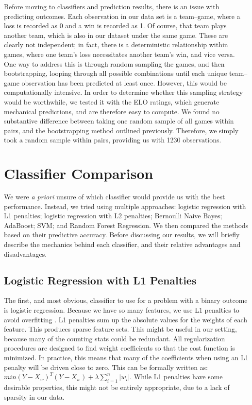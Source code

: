 \documentclass[12pt]{article}
\begin{document}
Before moving to classifiers and prediction results, there is an issue with predicting outcomes. Each observation in our data set is a team--game, where a loss is recorded as 0 and a win is recorded as 1. Of course, that team plays another team, which is also in our dataset under the same game. These are clearly not independent; in fact, there is a deterministic relationship within games, where one team's loss necessitates another team's win, and vice versa. One way to address this is through random sampling the games, and then bootstrapping, looping through all possible combinations until each unique team--game observation has been predicted at least once. However, this would be computationally intensive. In order to determine whether this sampling strategy would be worthwhile, we tested it with the ELO ratings, which generate mechanical predictions, and are therefore easy to compute. We found no substantive difference between taking one random sample of all games within pairs, and the bootstrapping method outlined previously. Therefore, we simply took a random sample within pairs, providing us with 1230 observations.


\section{Classifier Comparison}

We were \emph{a priori} unsure of which classifier would provide us with the best performance. Instead, we tried using multiple approaches: logistic regression with L1 penalties; logistic regression with L2 penalties; Bernoulli Naive Bayes; AdaBoost; SVM; and Random Forest Regression. We then compared the methods based on their predictive accuracy. Before discussing our results, we will briefly describe the mechanics behind each classifier, and their relative advantages and disadvantages.

\subsection{Logistic Regression with L1 Penalties}

The first, and most obvious, classifier to use for a problem with a binary outcome is logistic regression. Because we have so many features, we use L1 penalties to avoid overfitting \citep{tibshirani}. L1 penalties sum up the absolute values for the weights of each feature. This produces sparse feature sets. This might be useful in our setting, because many of the counting stats could be redundant. All regularization procedures are designed to find weight coefficients so that the cost function is minimized. In practice, this means that many of the coefficients when using an L1 penalty will be driven close to zero. This can be formally written as: $min(Y - X_{w})^{T}(Y-X_{w}) + \lambda\sum_{i=1}^{n}|w_{i}|$. While L1 penalties have some desirable properties, this might not be entirely appropriate, due to a lack of sparsity in our data.
\end{document}
